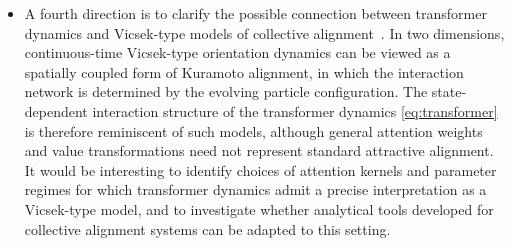 \documentclass[10pt]{article}
\theoremstyle{definition}
\theoremstyle{definition}
\numberwithin{equation}{section}
\newcommand{\NGT}[1]{\marginpar{\scriptsize\textcolor{blue}{NGT: {#1}}}}
\begin{document}
\begin{itemize}
    \item A fourth direction is to clarify the possible connection between transformer dynamics and Vicsek-type models of collective alignment~\cite{vicsek1995novel,degond2008continuum,degond2013macroscopic}. 
    In two dimensions, continuous-time Vicsek-type orientation dynamics can be viewed as a spatially coupled form of Kuramoto alignment, in which the interaction network is determined by the evolving particle configuration. 
    The state-dependent interaction structure of the transformer dynamics \eqref{eq:transformer} is therefore reminiscent of such models, although general attention weights and value transformations need not represent standard attractive alignment. 
    It would be interesting to identify choices of attention kernels and parameter regimes for which transformer dynamics admit a precise interpretation as a Vicsek-type model, and to investigate whether analytical tools developed for collective alignment systems can be adapted to this setting.
\end{itemize}

\end{document}
